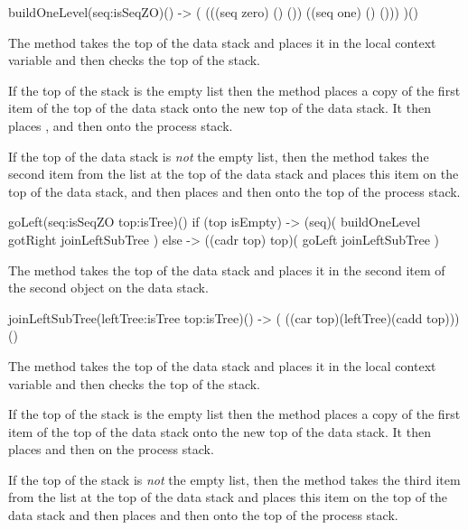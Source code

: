 \starttyping
\startJoylolCode
buildOneLevel(seq:isSeqZO)() -> (
  (((seq zero) () ()) ((seq one) () ()))
)()
\stopJoylolCode
\stoptyping

\item The  method takes the top of the data stack and places 
it in the  local context variable and then checks the top of the 
stack. 

If the top of the stack is the empty list then the  method 
places a copy of the first item of the top of the data stack onto the new 
top of the data stack. It then places ,  
and then  onto the process stack. 

If the top of the data stack is \emph{not} the empty list, then the 
 method takes the second item from the list at the top of the 
data stack and places this item on the top of the data stack, and then 
places  and then  onto the top of the 
process stack. 

\starttyping
\startJoylolCode
goLeft(seq:isSeqZO top:isTree)() {
  if (top isEmpty) {
    -> (seq)( buildOneLevel gotRight joinLeftSubTree )
  } else {
    -> ((cadr top) top)( goLeft joinLeftSubTree )
  }
}
\stopJoylolCode
\stoptyping

\item The  method takes the top of the data stack 
and places it in the second item of the second object on the data stack. 

\starttyping
\startJoylolCode
joinLeftSubTree(leftTree:isTree top:isTree)()
-> ( ((car top)(leftTree)(cadd top)))()
\stopJoylolCode
\stoptyping

\item The  method takes the top of the data stack and places 
it in the  local context variable and then checks the top of the 
stack. 

If the top of the stack is the empty list then the  method 
places a copy of the first item of the top of the data stack onto the new 
top of the data stack. It then places  and then 
 on the process stack. 

If the top of the stack is \emph{not} the empty list, then the 
 method takes the third item from the list at the top of the 
data stack and places this item on the top of the data stack and then 
places  and then  onto the top of the 
process stack. 

